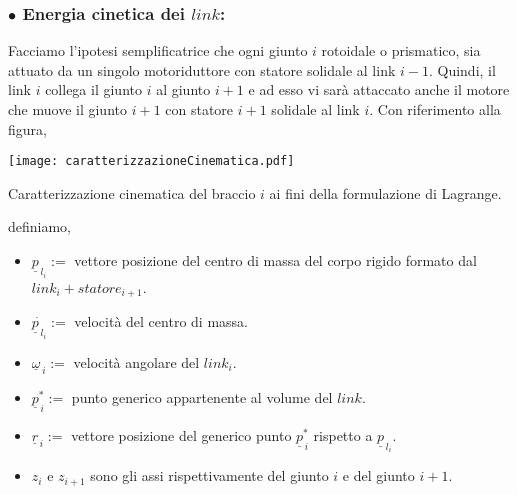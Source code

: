 \subsubsection{$\bullet$ Energia cinetica dei $link$:}
Facciamo l'ipotesi semplificatrice che ogni giunto $i$ rotoidale o prismatico, sia attuato da un singolo motoriduttore con statore solidale al link $i-1$. Quindi, il link $i$ collega il giunto $i$ al giunto $i+1$ e ad esso vi sarà attaccato anche il motore che muove il giunto $i+1$ con statore $i+1$ solidale al link $i$. Con riferimento alla figura,
\begin{center}
	\texttt{[image: caratterizzazioneCinematica.pdf]}
	\caption{Caratterizzazione cinematica del braccio $i$ ai fini della formulazione di Lagrange.}
\end{center}
definiamo,
\begin{itemize}
	\item $\underline{p}_{\,l_i} := $ vettore posizione del centro di massa del corpo rigido formato dal $link_i + statore_{i+1}$.
	\item $\dot{\underline{p}_{\,l_i}} := $ velocità del centro di massa.
	\item $\underline{\omega}_{\,i} := $ velocità angolare del $link_i$.
	\item $\underline{p}_{\,i}^* := $ punto generico appartenente al volume del $link$.
	\item $\underline{r}_{\,i} := $ vettore posizione del generico punto $\underline{p}_{\,i}^*$ rispetto a $\underline{p}_{\,l_i}$.
	\item $z_i$ e $z_{i+1}$ sono gli assi rispettivamente del giunto $i$ e del giunto $i+1$.
\end{itemize}

